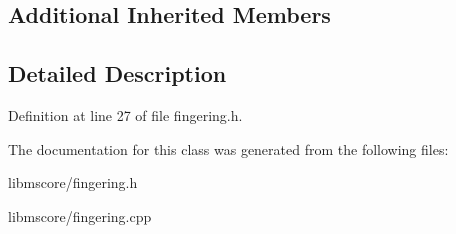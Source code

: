 \subsection*{Additional Inherited Members}


\subsection{Detailed Description}


Definition at line 27 of file fingering.\+h.



The documentation for this class was generated from the following files\+:\begin{DoxyCompactItemize}
\item 
libmscore/fingering.\+h\item 
libmscore/fingering.\+cpp\end{DoxyCompactItemize}
